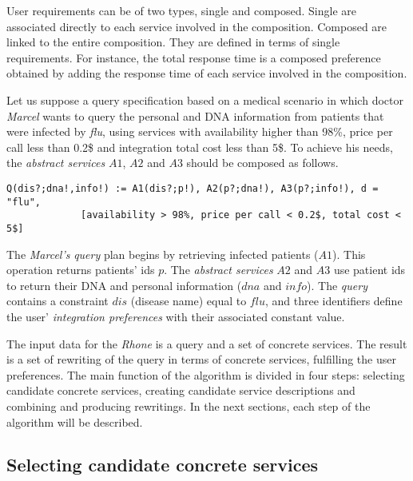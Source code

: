 User requirements can be of two types, single and composed. Single
are associated directly to each service involved in the composition. Composed
are linked to the entire composition. They are defined in terms of
single requirements. For instance, the total response time is a composed
preference obtained by adding the response time of each service involved in the composition.

Let us suppose a query specification based on a medical scenario in which doctor \textit{Marcel} wants to query the personal and DNA information from patients that were infected by \textit{flu}, using services with availability higher than 98\%, price per call less than 0.2\$ and integration total cost less than 5\$.
To achieve his needs, the \textit{abstract services} $A1$, $A2$ and $A3$ should be composed as follows. 

\begin{small}
\begin{verbatim}
Q(dis?;dna!,info!) := A1(dis?;p!), A2(p?;dna!), A3(p?;info!), d = "flu",
             [availability > 98%, price per call < 0.2$, total cost < 5$]
\end{verbatim}
\end{small}

The \textit{Marcel's }\textit{query} plan begins by retrieving infected patients ($A1$). This operation returns patients' ids $p$. The \textit{abstract services} $A2$ and $A3$ use patient ids to return their DNA and personal information ($dna$ and $info$).
The \textit{query} contains a constraint $dis$ (disease name) equal to $flu$, and three identifiers define the user' \textit{integration preferences} with their associated constant value. 

The input data for the \textit{Rhone} is a query and a set of concrete services. 
The result is a set of rewriting of the query in terms of concrete services, fulfilling the user preferences.
The main function of the algorithm is divided in four steps: selecting candidate concrete services, creating candidate service descriptions and combining and producing rewritings.
In the next sections, each step of the algorithm will be described. 

\subsection{Selecting candidate concrete services}

